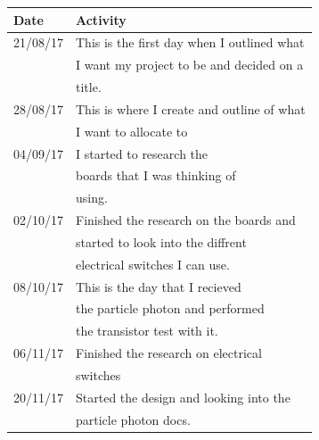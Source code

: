 \documentclass{article}
\begin{document}
\begin{tabularx}{\textwidth}{| X | X |}
    \hline
    \textbf{Date}            &               \textbf{Activity}           \\ \hline
    21/08/17                 &This is the first day when I outlined what \\
                             &I want my project to be and decided on a   \\
                             &title.                                     \\ \hline
    28/08/17                 &This is where I create and outline of what \\
                             &I want to allocate to                      \\ \hline
    04/09/17                 &I started to research the                  \\
                             &boards that I was thinking of              \\
                             &using.                                     \\ \hline
    02/10/17                 &Finished the research on the boards and    \\
                             &started to look into the diffrent          \\
                             &electrical switches I can use.             \\ \hline
    08/10/17                 &This is the day that I recieved            \\
                             &the particle photon and performed          \\
                             &the transistor test with it.               \\ \hline
    06/11/17                 &Finished the research on electrical        \\
                             &switches                                   \\ \hline
    20/11/17                 &Started the design and looking into the    \\
                             &particle photon docs.                      \\ \hline

\end{tabularx}
\end{document}
